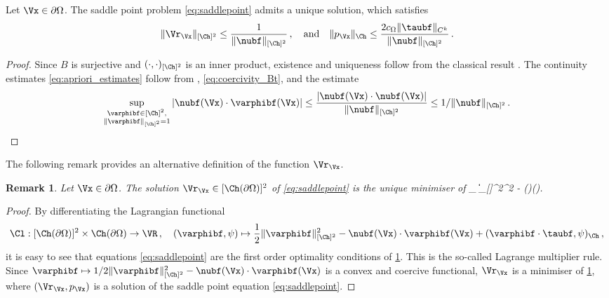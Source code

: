 \documentclass{siamart1116}
\newtheorem{remark}[theorem]{Remark}
\numberwithin{theorem}{section}
\begin{document}
\begin{lemma}\label{lem:rxwelldefined}
Let $\Vx\in \partial \Omega$. The saddle point problem \cref{eq:saddlepoint} admits a unique solution, which satisfies
\begin{equation}\label{eq:apriori_estimates}
\|\Vr_\Vx\|_{[\Ch]^2} \le
\frac{1}{ \Vert \nubf \Vert_{[\Ch]^2}}\,,
\quad \text{and} \quad
\|p_\Vx\|_{\Ch} \le \frac{2 c_{\Omega} \|\taubf\|_{C^k} 
}{ \Vert \nubf \Vert_{[\Ch]^2}}\,.
\end{equation}
\end{lemma}
\begin{proof}
Since $B$ is surjective and $(\cdot,\cdot)_{[\Ch]^2}$ is an inner product,
existence and uniqueness follow from the
classical result \cite[Thm 4.2.1, p.224]{BoBrFo13}. The continuity estimates \cref{eq:apriori_estimates} follow
from \cite[Thm 4.2.3, p.228]{BoBrFo13}, \cref{eq:coercivity_Bt}, and the estimate
\begin{equation}
\sup_{\substack{\varphibf \in [\Ch]^2,\\  \|\varphibf\|_{ [\Ch]^2}= 1}}|\nubf(\Vx)\cdot \varphibf(\Vx)|
\le \frac{|\nubf(\Vx)\cdot \nubf(\Vx)|}{ \Vert \nubf \Vert_{[\Ch]^2}} \leq1/ \Vert \nubf \Vert_{[\Ch]^2}\,.
\end{equation}
\end{proof}

The following remark provides an alternative definition of the function $\Vr_\Vx$.
\begin{remark}
Let $\Vx\in \partial \Omega$. The solution $\Vr_\Vx\in [\Ch(\partial\Omega)]^2 $ of \cref{eq:saddlepoint}
is the unique minimiser of 
\ben\label{eq:rx_minimiser}
\min_{}
 \|\varphibf\|_{[\Ch]^2}^2 - \nubf(\Vx)\cdot \varphibf(\Vx).
\een
\end{remark}
\begin{proof}
By differentiating the Lagrangian functional
\begin{equation}
\Cl:[\Ch(\partial\Omega)]^2\times \Ch(\partial\Omega)\to \VR\,,
\quad (\varphibf,\psi)\mapsto\frac{1}{2} \|\varphibf\|_{[\Ch]^2}^2 - \nubf(\Vx)\cdot \varphibf(\Vx) +
(\varphibf \cdot \taubf,\psi)_\Ch\,,
\end{equation}
it is easy to see that equations \cref{eq:saddlepoint} are the first order optimality conditions of \cref{eq:rx_minimiser}. This is the so-called Lagrange multiplier rule. 
Since $\varphibf \mapsto 1/2\|\varphibf\|_{[\Ch]^2}^2 - \nubf(\Vx)\cdot \varphibf(\Vx)$ is a convex and coercive functional,
 $\Vr_\Vx$ is a minimiser of \cref{eq:rx_minimiser}, where $(\Vr_\Vx,p_\Vx)$ is a solution of the 
 saddle point equation \cref{eq:saddlepoint}.
\end{proof}
\end{document}
